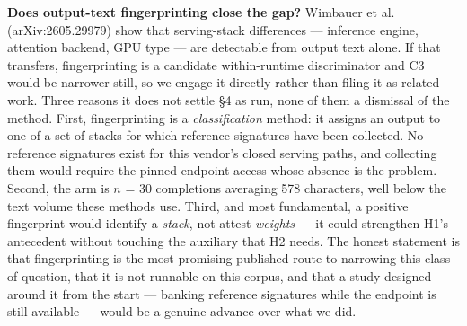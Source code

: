 \documentclass[11pt]{article}
\begin{document}
\textbf{Does output-text fingerprinting close the gap?} Wimbauer et al. (arXiv:2605.29979) show
that serving-stack differences --- inference engine, attention backend, GPU type --- are
detectable from output text alone. If that transfers, fingerprinting is a candidate
within-runtime discriminator and C3 would be narrower still, so we engage it directly
rather than filing it as related work. Three reasons it does not settle \S4 as run, none of
them a dismissal of the method. First, fingerprinting is a \emph{classification} method: it
assigns an output to one of a set of stacks for which reference signatures have been
collected. No reference signatures exist for this vendor's closed serving paths, and
collecting them would require the pinned-endpoint access whose absence is the problem.
Second, the arm is $n$ = 30 completions averaging 578 characters, well below the text volume
these methods use. Third, and most fundamental, a positive fingerprint would identify a
\emph{stack}, not attest \emph{weights} --- it could strengthen H1's antecedent without touching the
auxiliary that H2 needs. The honest statement is that fingerprinting is the most promising
published route to narrowing this class of question, that it is not runnable on this
corpus, and that a study designed around it from the start --- banking reference signatures
while the endpoint is still available --- would be a genuine advance over what we did.
\end{document}

